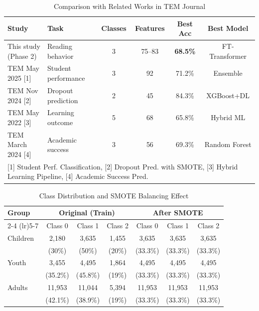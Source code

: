 \documentclass{article}
\begin{document}

\begin{table}[ht]
\centering
\caption{Comparison with Related Works in TEM Journal}
\label{tab:benchmark_literature}
\begin{tabular}{llcccc}
\toprule
\textbf{Study} & \textbf{Task} & \textbf{Classes} & \textbf{Features} & \textbf{Best Acc} & \textbf{Best Model} \\
\midrule
This study (Phase 2)       & Reading behavior & 3 & 75--83   & \textbf{68.5\%} & FT-Transformer \\
TEM May 2025 [1]           & Student performance & 3 & 92    & 71.2\%          & Ensemble \\
TEM Nov 2024 [2]           & Dropout prediction  & 2 & 45    & 84.3\%          & XGBoost+DL \\
TEM May 2022 [3]           & Learning outcome    & 5 & 68    & 65.8\%          & Hybrid ML \\
TEM March 2024 [4]         & Academic success    & 3 & 56    & 69.3\%          & Random Forest \\
\midrule
\multicolumn{6}{l}{\footnotesize [1] Student Perf. Classification, [2] Dropout Pred. with SMOTE, [3] Hybrid Learning Pipeline, [4] Academic Success Pred.} \\
\bottomrule
\end{tabular}
\end{table}


\begin{table}[ht]
\centering
\caption{Class Distribution and SMOTE Balancing Effect}
\label{tab:smote_effect}
\begin{tabular}{lcccccc}
\toprule
\multirow{2}{*}{\textbf{Group}} & \multicolumn{3}{c}{\textbf{Original (Train)}} & \multicolumn{3}{c}{\textbf{After SMOTE}} \\
\cmidrule(lr){2-4} \cmidrule(lr){5-7}
& Class 0 & Class 1 & Class 2 & Class 0 & Class 1 & Class 2 \\
\midrule
Children & 2,180 & 3,635 & 1,455 & 3,635 & 3,635 & 3,635 \\
& (30\%) & (50\%) & (20\%) & (33.3\%) & (33.3\%) & (33.3\%) \\
\midrule
Youth & 3,455 & 4,495 & 1,864 & 4,495 & 4,495 & 4,495 \\
& (35.2\%) & (45.8\%) & (19\%) & (33.3\%) & (33.3\%) & (33.3\%) \\
\midrule
Adults & 11,953 & 11,044 & 5,394 & 11,953 & 11,953 & 11,953 \\
& (42.1\%) & (38.9\%) & (19\%) & (33.3\%) & (33.3\%) & (33.3\%) \\
\bottomrule
\end{tabular}
\end{table}
\end{document}
